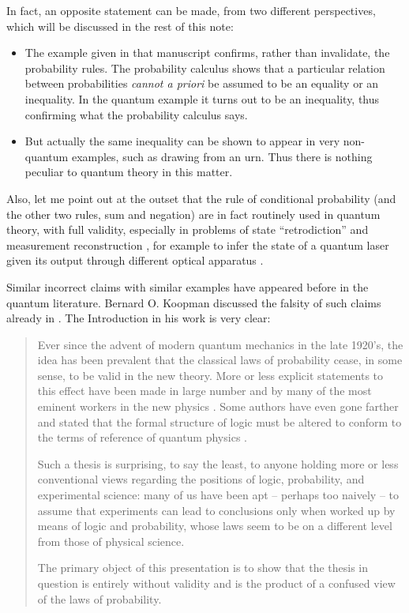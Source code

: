 \documentclass[\ifafour a4paper,12pt,\else a5paper,10pt,\fi%
onecolumn,oneside,article,%
british%
]{memoir}
\theoremstyle{remark}
\theoremstyle{innote}
\newcommand*{\citep}{\parencites}%
\renewcommand*{\|}[1][]{\nonscript\,#1\vert\nonscript\;\mathopen{}}
\newcommand*{\sect}{\S}%
\newcommand*{\chaps}{chs}%
\begin{document}
In fact, an opposite statement can be made, from two different
perspectives, which will be discussed in the rest of this note:
\begin{itemize}
\item The example given in that manuscript confirms, rather than
  invalidate, the probability rules. The probability calculus shows that a
  particular relation between probabilities \emph{cannot a priori} be
  assumed to be an equality or an inequality. In the quantum example it
  turns out to be an inequality, thus confirming what the probability
  calculus says.
\item But actually the same inequality can be shown to appear in very
  non-quantum examples, such as drawing from an urn. Thus there is nothing
  peculiar to quantum theory in this matter.
\end{itemize}

Also, let me point out at the outset that the rule of conditional
probability (and the other two rules, sum and negation) are in fact
routinely used in quantum theory, with full validity, especially in
problems of state \enquote{retrodiction} and measurement reconstruction
\citep{jones1991b,slater1995b}[\chaps~7,8]{demuynck2002b}{barnettetal2003,zimanetal2004_r2006,darianoetal2004}[see][\sect~1
for many further references]{maanssonetal2006}, for example to infer the
state of a quantum laser given its output through different optical
apparatus \citep{leonhardt1997}.

Similar incorrect claims with similar examples have appeared before in the
quantum literature. Bernard O. Koopman \citep[of the Pitman-Koopman
theorem for sufficient statistics,][]{koopman1936} discussed the
falsity of such claims already in \cite*{koopman1957}. The Introduction in
his work is very clear:
\begin{quotation}\footnotesize
  Ever since the advent of modern quantum mechanics in the late
  1920's, the idea has been prevalent that the classical laws of
  probability cease, in some sense, to be valid in the new theory. More or
  less explicit statements to this effect have been made in large number
  and by many of the most eminent workers in the new physics \textelp{}.
  Some authors have even gone farther and stated that the formal structure
  of logic must be altered to conform to the terms of reference of quantum
  physics \textelp{}.

  Such a thesis is surprising, to say the least, to anyone holding more or
  less conventional views regarding the positions of logic, probability,
  and experimental science: many of us have been apt -- perhaps too naively
  -- to assume that experiments can lead to conclusions only when worked up
  by means of logic and probability, whose laws seem to be on a different
  level from those of physical science.

  The primary object of this presentation is to show that the thesis in
  question is entirely without validity and is the product of a confused
  view of the laws of probability.
\end{quotation}
\end{document}
